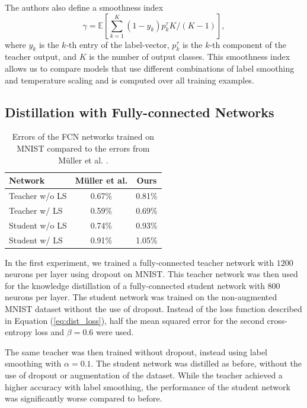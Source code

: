 The authors also define a smoothness index 
 \begin{equation}
    \label{eq:dist_smooth}
    \gamma = \mathbb{E}\left\lbrack \sum_{k=1}^K(1-y_k)p_k^\tau K/(K-1)\right\rbrack,
\end{equation}
where $y_k$ is the $k$-th entry of the label-vector, $p_k^\tau$ is the $k$-th component of the teacher output, and $K$ is the number of output classes. This smoothness index allows us to compare models that use different combinations of label smoothing and temperature scaling and is computed over all training examples.

\subsection{Distillation with Fully-connected Networks}

\begin{table}\vspace{-0.4cm}
\footnotesize
    \centering
    \caption{Errors of the FCN networks trained on MNIST compared to the errors from Müller et al. \cite{mueller2019}.}
    \begin{tabular}{|l|c|c|}
    \hline
        \sc Network & \sc Müller et al. & \sc Ours\\
        \hline
        \sc Teacher w/o LS & 0.67\% & 0.81\%\\
        \sc Teacher w/ LS & 0.59\% & 0.69\%\\
        \hline
        \sc Student w/o LS & 0.74\% & 0.93\%\\
        \sc Student w/ LS & 0.91\% & 1.05\%\\
        \hline
    \end{tabular}
    \label{tab:acc_toy_kd}
\end{table}

In the first experiment, we trained a fully-connected teacher network with $1200$ neurons per layer using dropout on MNIST. This teacher network was then used for the knowledge distillation of a fully-connected student network with $800$ neurons per layer. The student network was trained on the non-augmented MNIST dataset without the use of dropout. Instead of the loss function described in Equation (\ref{eq:dist_loss}), half the mean squared error for the second cross-entropy loss and $\beta = 0.6$ were used.

The same teacher was then trained without dropout, instead using label smoothing with $\alpha = 0.1$. The student network was distilled as before, without the use of dropout or augmentation of the dataset. While the teacher achieved a higher accuracy with label smoothing, the performance of the student network was significantly worse compared to before.

